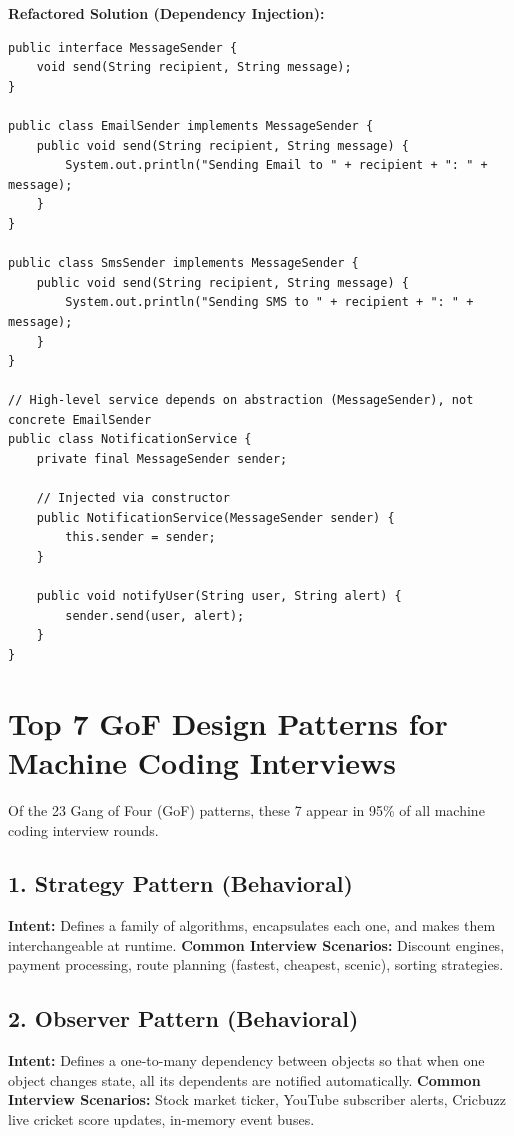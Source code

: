 \documentclass[10pt,journal,compsoc,onecolumn]{IEEEtran}
\begin{document}
\textbf{Refactored Solution (Dependency Injection):}
\begin{verbatim}
public interface MessageSender {
    void send(String recipient, String message);
}

public class EmailSender implements MessageSender {
    public void send(String recipient, String message) {
        System.out.println("Sending Email to " + recipient + ": " + message);
    }
}

public class SmsSender implements MessageSender {
    public void send(String recipient, String message) {
        System.out.println("Sending SMS to " + recipient + ": " + message);
    }
}

// High-level service depends on abstraction (MessageSender), not concrete EmailSender
public class NotificationService {
    private final MessageSender sender;

    // Injected via constructor
    public NotificationService(MessageSender sender) {
        this.sender = sender;
    }

    public void notifyUser(String user, String alert) {
        sender.send(user, alert);
    }
}
\end{verbatim}

\section{Top 7 GoF Design Patterns for Machine Coding Interviews}
\label{sec:design_patterns}

Of the 23 Gang of Four (GoF) patterns, these 7 appear in 95\% of all machine coding interview rounds.

\subsection{1. Strategy Pattern (Behavioral)}
\textbf{Intent:} Defines a family of algorithms, encapsulates each one, and makes them interchangeable at runtime.
\textbf{Common Interview Scenarios:} Discount engines, payment processing, route planning (fastest, cheapest, scenic), sorting strategies.

\subsection{2. Observer Pattern (Behavioral)}
\textbf{Intent:} Defines a one-to-many dependency between objects so that when one object changes state, all its dependents are notified automatically.
\textbf{Common Interview Scenarios:} Stock market ticker, YouTube subscriber alerts, Cricbuzz live cricket score updates, in-memory event buses.
\end{document}
